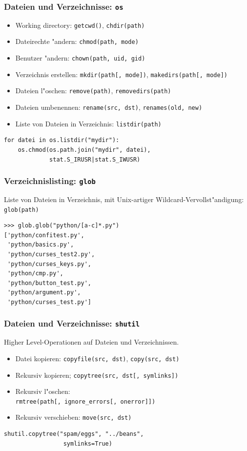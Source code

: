 \begin{frame}[fragile]
\frametitle{Dateien und Verzeichnisse: \texttt{os}}
\begin{itemize}
\item Working directory: \lstinline{getcwd()}, \lstinline{chdir(path)}
\item Dateirechte "andern: \lstinline{chmod(path, mode)}
\item Benutzer "andern: \lstinline{chown(path, uid, gid)}
\item Verzeichnis erstellen: \lstinline{mkdir(path[, mode])}, \lstinline{makedirs(path[, mode])}
\item Dateien l"oschen: \lstinline{remove(path)}, \lstinline{removedirs(path)}
\item Dateien umbenennen: \lstinline{rename(src, dst)}, \lstinline{renames(old, new)}
\item Liste von Dateien in Verzeichnis: \lstinline{listdir(path)}
\end{itemize}
\begin{lstlisting}[style=Python]
for datei in os.listdir("mydir"):
    os.chmod(os.path.join("mydir", datei), 
             stat.S_IRUSR|stat.S_IWUSR)
\end{lstlisting}
\end{frame} 

\begin{frame}[fragile]
\frametitle{Verzeichnislisting: \texttt{glob}}
Liste von Dateien in Verzeichnis, mit Unix-artiger Wildcard-Vervollst"andigung: \texttt{glob(path)}
\begin{lstlisting}[style=Shell]
>>> glob.glob("python/[a-c]*.py")
['python/confitest.py',
 'python/basics.py',
 'python/curses_test2.py',
 'python/curses_keys.py',
 'python/cmp.py',
 'python/button_test.py',
 'python/argument.py',
 'python/curses_test.py']
\end{lstlisting}
\end{frame}

\begin{frame}[fragile]
\frametitle{Dateien und Verzeichnisse: \texttt{shutil}}
Higher Level-Operationen auf Dateien und Verzeichnissen.
\begin{itemize}
\item Datei kopieren: \texttt{copyfile(src, dst)}, \texttt{copy(src, dst)}
\item Rekursiv kopieren; \texttt{copytree(src, dst[, symlinks])}
\item Rekursiv l"oschen: \\\texttt{rmtree(path[, ignore\_errors[, onerror]])}
\item Rekursiv verschieben: \texttt{move(src, dst)}
\end{itemize}
\begin{lstlisting}[style=Python]
shutil.copytree("spam/eggs", "../beans", 
                 symlinks=True)
\end{lstlisting}
\end{frame}

